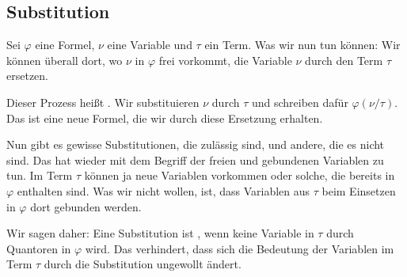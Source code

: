 \begin{math-stroke}
\end{math-stroke}

\subsection{Substitution}

\begin{spoken-clean}[01:13:27 - 01:16:27]
Sei $\varphi$ eine Formel, $\nu$ eine Variable und $\tau$ ein Term. Was wir nun tun können: Wir können überall dort, wo $\nu$ in $\varphi$ frei vorkommt, die Variable $\nu$ durch den Term $\tau$ ersetzen. 

Dieser Prozess heißt . Wir substituieren $\nu$ durch $\tau$ und schreiben dafür $\varphi(\nu/\tau)$. Das ist eine neue Formel, die wir durch diese Ersetzung erhalten.
\end{spoken-clean}

\begin{math-stroke}[Substitution]
\end{math-stroke}

\begin{ai-global-state-checkpoint-invisible-content}
\end{ai-global-state-checkpoint-invisible-content}

\begin{spoken-clean}[01:16:27 - 01:19:27]
Nun gibt es gewisse Substitutionen, die zulässig sind, und andere, die es nicht sind. Das hat wieder mit dem Begriff der freien und gebundenen Variablen zu tun. Im Term $\tau$ können ja neue Variablen vorkommen oder solche, die bereits in $\varphi$ enthalten sind. Was wir nicht wollen, ist, dass Variablen aus $\tau$ beim Einsetzen in $\varphi$ dort gebunden werden. 

Wir sagen daher: Eine Substitution ist , wenn keine Variable in $\tau$ durch Quantoren in $\varphi$  wird. Das verhindert, dass sich die Bedeutung der Variablen im Term $\tau$ durch die Substitution ungewollt ändert.
\end{spoken-clean}

